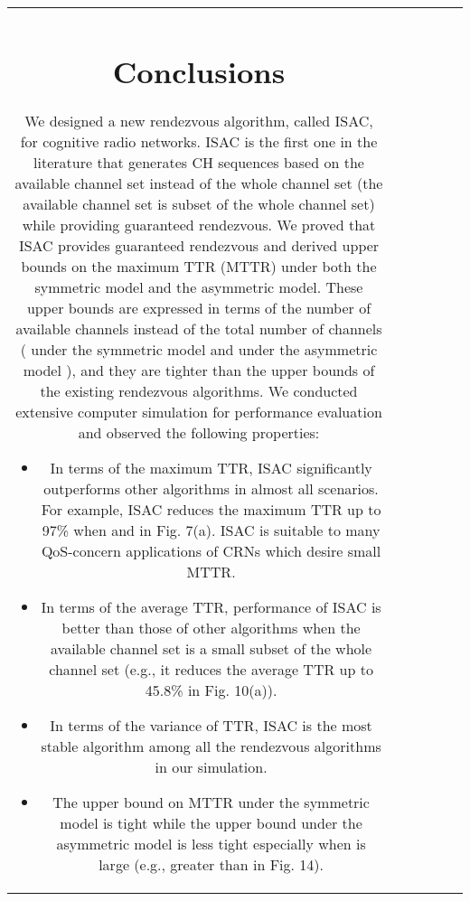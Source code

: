 \documentclass[journal]{IEEEtran}
\begin{document}
\begin{table*}
\begin{tabular}{|c|c|c|c|c|c|}
{\section{Conclusions}
We designed a new rendezvous algorithm, called ISAC, for cognitive radio networks. ISAC is the first one in the literature that generates CH sequences based on the available channel set instead of the whole channel set (the available channel set is subset of the whole channel set) while providing guaranteed rendezvous. We proved that ISAC provides guaranteed rendezvous and derived upper bounds on the maximum TTR (MTTR) under both the symmetric model and the asymmetric model. These upper bounds are expressed in terms of the number of available channels instead of the total number of channels ( under the symmetric model and  under the asymmetric model ), and  they are tighter than the upper bounds of the existing rendezvous algorithms. We conducted extensive computer simulation for performance evaluation and observed the following properties:
\begin{itemize}
\item In terms of the maximum TTR, ISAC significantly outperforms other algorithms in almost all scenarios. For example, ISAC reduces the maximum TTR up to 97\% when  and  in Fig. 7(a). ISAC is suitable to many QoS-concern applications of CRNs which desire small MTTR.
\item In terms of the average TTR, performance of ISAC is better than those of other algorithms when the available channel set is a small subset of the whole channel set (e.g., it reduces the average TTR up to 45.8\% in Fig. 10(a)).
\item In terms of the variance of TTR, ISAC is the most stable algorithm among all the rendezvous algorithms in our simulation.
\item The upper bound on MTTR under the symmetric model is tight while the upper bound under the asymmetric model is less tight especially when  is large (e.g., greater than  in Fig. 14).
\end{itemize}
\begin{thebibliography}{1}


\end{thebibliography}}
\end{tabular}
\end{table*}
\end{document}
